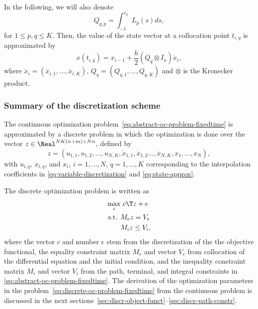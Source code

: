 \documentclass[a4paper,11pt,DIV12]{scrartcl}
\theoremstyle{remark}
\begin{document}
In the following, we will also denote
\begin{equation}
  \label{eq:L-integral}
  Q_{q,p} = \int_{-1}^{r_q} L_p(s) ds,
\end{equation}
for $1 \leq p,q \leq K$.
Then, the value of the state vector at a collocation point $t_{i,q}$ is approximated by
\begin{equation}
  \label{eq:state-approx-collocation}
  x(t_{i,q}) = x_{i-1} + \frac{h}{2} (Q_q \otimes I_n) \dot x_i,
\end{equation}
where $\dot x_i = (\dot x_{i,1}, \dotsc, \dot x_{i,K})$, $Q_q = (Q_{q,1}, \dotsc, Q_{q,K})$ and $\otimes$ is the Kronecker product.

\subsubsection{Summary of the discretization scheme}
\label{sec:summ-discr-scheme}

The continuous optimization problem~\eqref{eq:abstract-oc-problem-fixedtime} is approximated by a discrete problem in which the optimization is done over the vector $z \in \Real^{NK(n+m)+Nn}$, defined by
\begin{equation}
  \label{eq:discrete-optimization-vector}
  z = (u_{1,1}, u_{1,2}, \dotsc, u_{N,K}, \dot x_{1,1}, \dot x_{1,2} \dotsc, \dot x_{N,K}, x_1, \dotsc, x_N),
\end{equation}
with $u_{i,q}$, $\dot x_{i,q}$, and $x_i$, $i=1,\dotsc,N$, $q=1,\dotsc,K$ corresponding to the interpolation coefficients in \eqref{eq:variable-discretization} and \eqref{eq:state-approx}.

The discrete optimization problem is written as
\begin{equation}
  \label{eq:discrete-oc-problem-fixedtime}
  \begin{aligned}
    \max_{z} &\ c\T z + e \\
    \textnormal{s.t. } & M_e z = V_e \\
    & M_i z \leq V_i,
  \end{aligned}
\end{equation}
where the vector $c$ and number $e$ stem from the discretization of the the objective functional, the equality constraint matrix $M_e$ and vector $V_e$ from collocation of the differential equation and the initial condition, and the inequality constraint matrix $M_i$ and vector $V_i$ from the path, terminal, and integral constraints in \eqref{eq:abstract-oc-problem-fixedtime}.
The derivation of the optimization parameters in the problem~\eqref{eq:discrete-oc-problem-fixedtime} from the continuous problem is discussed in the next sections~\ref{sec:discr-object-funct}--\ref{sec:discr-path-constr}.
\end{document}
